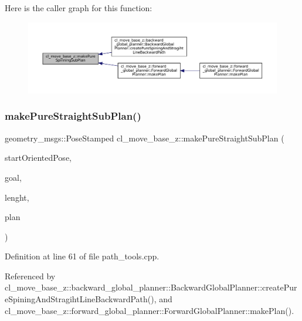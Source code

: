 Here is the caller graph for this function\+:
\nopagebreak
\begin{figure}[H]
\begin{center}
\leavevmode
\includegraphics[width=350pt]{namespacecl__move__base__z_ac774e138510eb7b5e0015be1f7709e19_icgraph}
\end{center}
\end{figure}
\mbox{\label{namespacecl__move__base__z_a1d6998cc28a1847906272f2bf92bacc8}} 
\subsubsection{\texorpdfstring{make\+Pure\+Straight\+Sub\+Plan()}{makePureStraightSubPlan()}}
{\footnotesize\ttfamily geometry\+\_\+msgs\+::\+Pose\+Stamped cl\+\_\+move\+\_\+base\+\_\+z\+::make\+Pure\+Straight\+Sub\+Plan (\begin{DoxyParamCaption}\item[{const geometry\+\_\+msgs\+::\+Pose\+Stamped \&}]{start\+Oriented\+Pose,  }\item[{const geometry\+\_\+msgs\+::\+Point \&}]{goal,  }\item[{double}]{lenght,  }\item[{std\+::vector$<$ geometry\+\_\+msgs\+::\+Pose\+Stamped $>$ \&}]{plan }\end{DoxyParamCaption})}



Definition at line 61 of file path\+\_\+tools.\+cpp.



Referenced by cl\+\_\+move\+\_\+base\+\_\+z\+::backward\+\_\+global\+\_\+planner\+::\+Backward\+Global\+Planner\+::create\+Pure\+Spining\+And\+Stragiht\+Line\+Backward\+Path(), and cl\+\_\+move\+\_\+base\+\_\+z\+::forward\+\_\+global\+\_\+planner\+::\+Forward\+Global\+Planner\+::make\+Plan().


